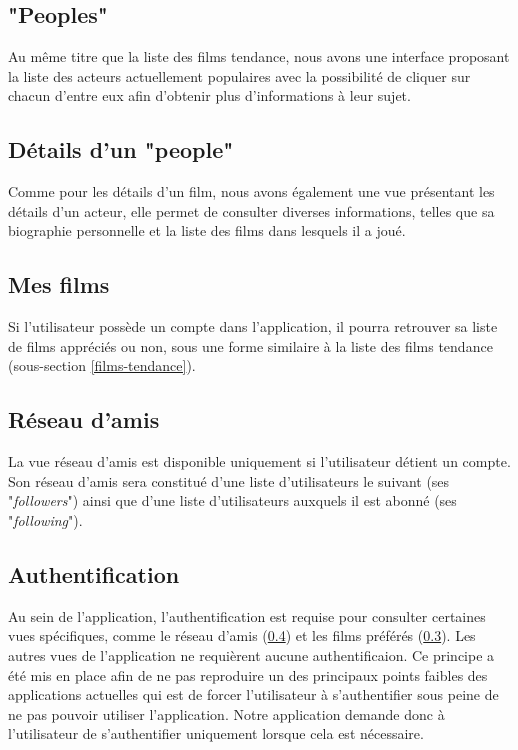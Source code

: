 \subsection{"Peoples"}
Au même titre que la liste des films tendance, nous avons une interface proposant la liste des acteurs actuellement populaires avec la possibilité de cliquer sur chacun d'entre eux afin d'obtenir plus d'informations à leur sujet.

\subsection{Détails d'un "people"}
Comme pour les détails d'un film, nous avons également une vue présentant les détails d'un acteur, elle permet de consulter diverses informations, telles que sa biographie personnelle et la liste des films dans lesquels il a joué.

\subsection{Mes films}\label{mes-films}
Si l'utilisateur possède un compte dans l'application, il pourra retrouver sa liste de films appréciés ou non, sous une forme similaire à la liste des films tendance (sous-section \ref{films-tendance}).

\subsection{Réseau d'amis}\label{reseau-amis}
La vue réseau d'amis est disponible uniquement si l'utilisateur détient un compte. Son réseau d'amis sera constitué d'une liste d'utilisateurs le suivant (ses "\textit{followers}") ainsi que d'une liste d'utilisateurs auxquels il est abonné (ses "\textit{following}").

\subsection{Authentification}
Au sein de l'application, l'authentification est requise pour consulter certaines vues spécifiques, comme le réseau d'amis (\ref{reseau-amis}) et les films préférés (\ref{mes-films}).
Les autres vues de l'application ne requièrent aucune authentificaion. Ce principe a été mis en place afin de ne pas reproduire un des principaux points faibles des applications actuelles qui est de forcer l'utilisateur à s'authentifier sous peine de ne pas pouvoir utiliser l'application. Notre application demande donc à l'utilisateur de s'authentifier uniquement lorsque cela est nécessaire.
 
